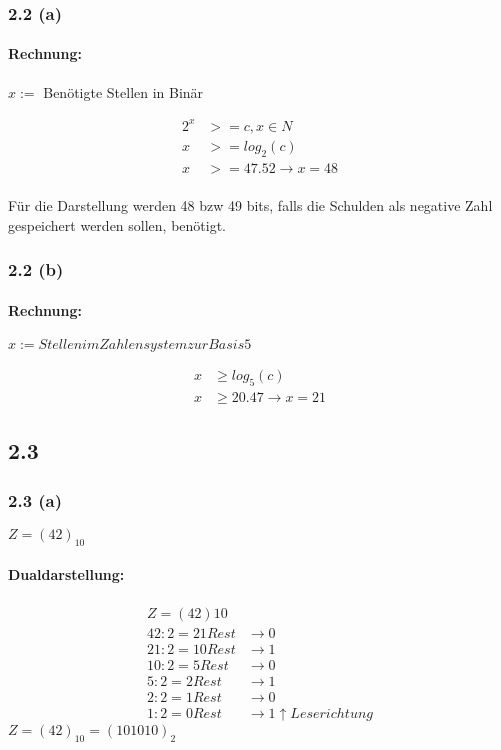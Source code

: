 \documentclass[11pt,a4paper]{article}
\begin{document}
\subsubsection{2.2 (a)}
\paragraph{Rechnung:}

$x :=$ Benötigte Stellen in Binär

\begin{align}
2^x &>= c, x \in N\\
x &>= log_2(c)\\
x &>= 47.52 \rightarrow x = 48
\end{align}

\paragraph{}
Für die Darstellung werden 48 bzw 49 bits, falls die Schulden als negative Zahl gespeichert werden sollen, benötigt.

\subsubsection{2.2 (b)}
\paragraph{Rechnung:}
$x := Stellen im Zahlensystem zur Basis 5$

\begin{align}
x &\geq log_5(c)\\
x &\geq 20.47 \rightarrow x = 21
\end{align}

\subsection{2.3}

\subsubsection{2.3 (a)}
$Z = (42)_10$

\paragraph{Dualdarstellung:}
\begin{align*}
Z = (42)10\\
42: 2 = 21 Rest &\rightarrow 0\\
21: 2 = 10 Rest &\rightarrow 1\\
10:2 = 5 Rest &\rightarrow 0\\
5 : 2 = 2 Rest &\rightarrow 1\\
2 : 2 = 1 Rest &\rightarrow 0\\
1 : 2 = 0 Rest &\rightarrow 1 \uparrow Leserichtung
\end{align*}
$Z = (42)_{10} = (101010)_2$
\end{document}

